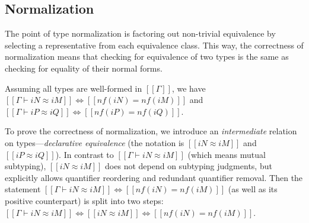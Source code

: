 \subsection{Normalization}
    The point of type normalization is factoring out non-trivial equivalence 
    by selecting a representative from each equivalence class.
    This way, the correctness of normalization means that
    checking for equivalence of two types is the same as checking for equality of their normal forms.
    \begin{lemma*}
        Assuming all types are well-formed in $[[Γ]]$, we have
            $[[Γ ⊢ iN ≈ iM]] \iff [[nf(iN) = nf(iM)]]$ and 
            $[[Γ ⊢ iP ≈ iQ]] \iff [[nf(iP) = nf(iQ)]]$.
    \end{lemma*}
    To prove the correctness of normalization, 
    we introduce an \emph{intermediate} relation on types---\emph{declarative equivalence}
    (the notation is $[[iN ≈ iM]]$ and $[[iP ≈ iQ]]$).
    In contrast to $[[Γ ⊢ iN ≈ iM]]$ (which means mutual subtyping), $[[iN ≈ iM]]$ does not depend on subtyping judgments, 
    but explicitly allows quantifier reordering and redundant quantifier removal.
    Then the statement $[[Γ ⊢ iN ≈ iM]] \iff [[nf(iN) = nf(iM)]]$ (as well as its positive counterpart) 
    is split into two steps: $[[Γ ⊢ iN ≈ iM]] \iff [[iN ≈ iM]] \iff [[nf(iN) = nf(iM)]]$.





